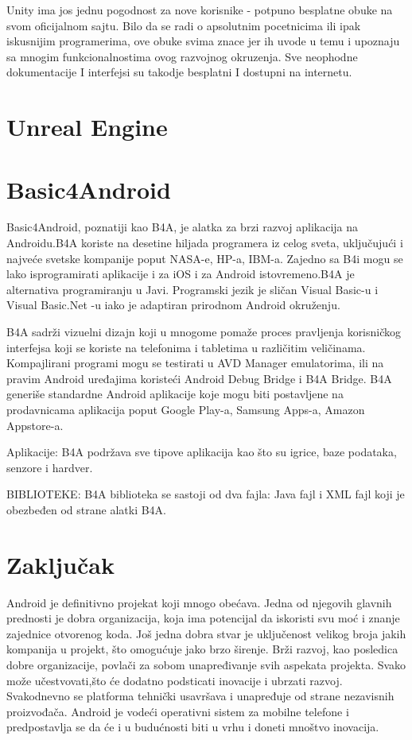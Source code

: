 \documentclass[12pt]{article}
\begin{document}
Unity ima jos jednu pogodnost za nove korisnike - potpuno besplatne obuke na svom oficijalnom sajtu.
Bilo da se radi o apsolutnim pocetnicima ili ipak iskusnijim programerima, ove obuke svima znace jer ih uvode u temu i upoznaju sa mnogim      funkcionalnostima ovog razvojnog okruzenja.
Sve neophodne dokumentacije I interfejsi su takodje besplatni I dostupni na internetu.

\section{Unreal Engine}

\section{Basic4Android}
\hspace*{1cm} Basic4Android, poznatiji kao B4A, je alatka za brzi razvoj aplikacija na Androidu.B4A koriste na desetine hiljada programera iz celog sveta, uključujući i najveće svetske kompanije poput NASA-e, HP-a, IBM-a.
Zajedno sa B4i mogu se lako isprogramirati aplikacije i za iOS i za Android istovremeno.B4A je alternativa programiranju u Javi. Programski jezik je sličan Visual Basic-u i Visual Basic.Net -u iako je adaptiran prirodnom Android okruženju.

B4A sadrži vizuelni dizajn koji u mnogome pomaže proces pravljenja korisničkog interfejsa koji se koriste na telefonima i tabletima u različitim veličinama. Kompajlirani programi mogu se testirati u AVD Manager emulatorima, ili na pravim Android uređajima koristeći Android Debug Bridge i B4A Bridge. 
B4A generiše standardne Android aplikacije koje mogu biti postavljene na prodavnicama aplikacija poput Google Play-a, Samsung Apps-a, Amazon Appstore-a.

Aplikacije:
B4A podržava sve tipove aplikacija kao što su igrice, baze podataka, senzore i hardver.

BIBLIOTEKE:
B4A biblioteka se sastoji od dva fajla: Java fajl i XML fajl koji je obezbeđen od strane alatki B4A.

\section{Zaključak}

Android je definitivno projekat koji mnogo obećava. Jedna od njegovih glavnih prednosti je dobra organizacija, koja ima potencijal da iskoristi svu moć i znanje zajednice otvorenog koda. Još jedna dobra stvar je uključenost velikog broja jakih kompanija u projekt, što omogućuje jako brzo širenje.
Brži razvoj, kao posledica dobre organizacije, povlači za sobom unapređivanje svih aspekata projekta.
Svako može učestvovati,što će dodatno podsticati inovacije i ubrzati razvoj.
Svakodnevno se platforma tehnički usavršava i unapređuje od strane nezavisnih
proizvođača. Android je vodeći operativni sistem za mobilne telefone i predpostavlja se da će
i u budućnosti biti u vrhu i doneti mnoštvo inovacija.

\pagebreak
\begin{thebibliography}{}
\end{thebibliography}
\end{document}
